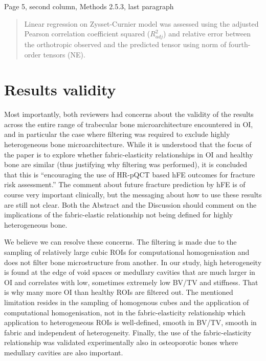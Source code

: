 \documentclass{AR2RC}
\begin{document}
Page 5, second column, Methods 2.5.3, last paragraph
\begin{quote}
	Linear regression on Zysset-Curnier model was assessed using the adjusted Pearson correlation coefficient squared ($R^2_{adj}$) and relative error between the orthotropic observed and the predicted tensor using norm of fourth-order tensors (NE). 
\end{quote}

\section{Results validity}
\RC Most importantly, both reviewers had concerns about the validity of the results across the entire range of trabecular bone microarchitecture encountered in OI, and in particular the case where filtering was required to exclude highly heterogeneous bone microarchitecture. While it is understood that the focus of the paper is to explore whether fabric-elasticity relationships in OI and healthy bone are similar (thus justifying why filtering was performed), it is concluded that this is “encouraging the use of HR-pQCT based hFE outcomes for fracture risk assessment.” The comment about future fracture prediction by hFE is of course very important clinically, but the messaging about how to use these results are still not clear. Both the Abstract and the Discussion should comment on the implications of the fabric-elastic relationship not being defined for highly heterogeneous bone. 

\AR We believe we can resolve these concerns. The filtering is made due to the sampling of relatively large cubic ROIs for computational homogenisation and does not filter bone microstructure from another. In our study, high heterogeneity is found at the edge of void spaces or medullary cavities that are much larger in OI and correlates with low, sometimes extremely low BV/TV and stiffness. That is why many more OI than healthy ROIs are filtered out.
The mentioned limitation resides in the sampling of homogenous cubes and the application of computational homogenisation, not in the fabric-elasticity relationship which application to heterogeneous ROIs is well-defined, smooth in BV/TV, smooth in fabric and independent of heterogeneity. Finally, the use of the fabric-elasticity relationship was validated experimentally also in osteoporotic bones where medullary cavities are also important.
\end{document}
